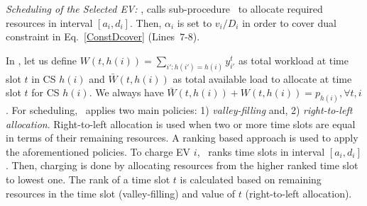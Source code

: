 		\emph{Scheduling of the Selected EV:} , \ics calls sub-procedure \sa\ to allocate required resources in interval $[a_i,d_i]$. Then, $\alpha _i$ is set to $v_i\slash D_i$ in order to cover dual constraint in Eq.~\eqref{ConstDcover} (Lines~$7$-$8$). 
		
		In \sa, 
		let us define $W(t,h(i))=\sum_{i': h(i')=h(i)} y_{i'}^t$ as total workload at time slot $t$ in CS $h(i)$ and $\bar{W}(t,h(i))$ as total available load to allocate at time slot $t$ for CS $h(i)$. We always have ${\bar{W}(t,h(i))+W(t,h(i))=p_{h(i)},  \forall t, i}$. For scheduling, \sa\ applies two main policies: 1) \emph{valley-filling} and, 2) \emph{right-to-left allocation}.  %
				Right-to-left allocation is used when two or more time slots are equal in terms of their remaining resources. 
A ranking based approach is used to apply the aforementioned policies. 
		To charge  EV $i$, \sa\ ranks time slots in interval $[a_i,d_i]$. Then, charging is done by allocating resources from the higher ranked time slot to lowest one. The rank of a time slot $t$ is calculated based on remaining resources in the time slot (valley-filling) and value of $t$ (right-to-left allocation). 
		
